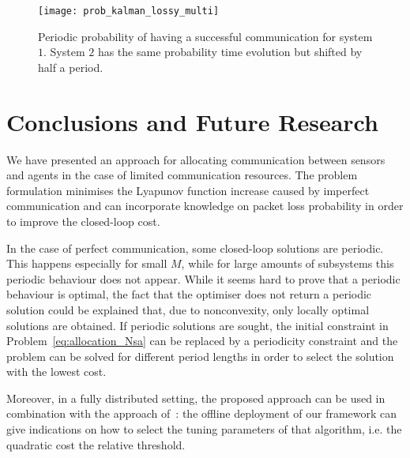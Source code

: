 \documentclass[letterpaper, 10 pt, conference]{ieeeconf}  %
\begin{document}
\begin{figure}
	\begin{center}
		\texttt{[image: prob\_kalman\_lossy\_multi]}
		\caption{Periodic probability of having a successful communication for system $1$. System $2$ has the same probability time evolution but shifted by half a period.}
		\label{fig:prob}
	\end{center}
\end{figure}


%
%
%
%
\section{Conclusions and Future Research}
\label{sec:conclusions}

We have presented an approach for allocating communication between sensors and agents in the case of limited communication resources. The problem formulation minimises the Lyapunov function increase caused by imperfect communication and can incorporate knowledge on packet loss probability in order to improve the closed-loop cost.

In the case of perfect communication, some closed-loop solutions are periodic. This happens especially for small $M$, while for large amounts of subsystems this periodic behaviour does not appear. While it seems hard to prove that a periodic behaviour is optimal, the fact that the optimiser does not return a periodic solution could be explained that, due to nonconvexity, only locally optimal solutions are obtained. If periodic solutions are sought, the initial constraint in Problem~\eqref{eq:allocation_Nsa} can be replaced by a periodicity constraint and the problem can be solved for different period lengths in order to select the solution with the lowest cost. 

Moreover, in a fully distributed setting, the proposed approach can be used in combination with the approach of~\cite{Mamduhi2015}: the offline deployment of our framework can give indications on how to select the tuning parameters of that algorithm, i.e. the quadratic cost the relative threshold.
\end{document}
